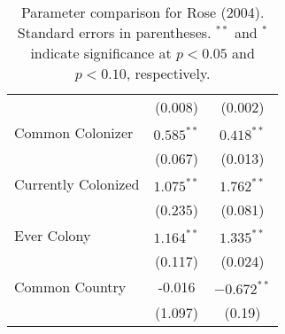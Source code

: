 \begin{table}[ht]
\begin{tabular}{lcc}
   & (0.008) & (0.002) \\ 
  Common Colonizer & $0.585^{\ast\ast}$ & $0.418^{\ast\ast}$ \\ 
   & (0.067) & (0.013) \\ 
  Currently Colonized & $1.075^{\ast\ast}$ & $1.762^{\ast\ast}$ \\ 
   & (0.235) & (0.081) \\ 
  Ever Colony & $1.164^{\ast\ast}$ & $1.335^{\ast\ast}$ \\ 
   & (0.117) & (0.024) \\ 
  Common Country & -0.016 & $-0.672^{\ast\ast}$ \\ 
   & (1.097) & (0.19) \\ 
   \hline
\hline
\end{tabular}
\endgroup
\caption{Parameter comparison for Rose (2004). Standard errors in parentheses. $^{**}$ and $^{*}$ indicate significance at $p<0.05$ and $p<0.10$, respectively.} 
\label{tab:rose_coef}
\end{table}
